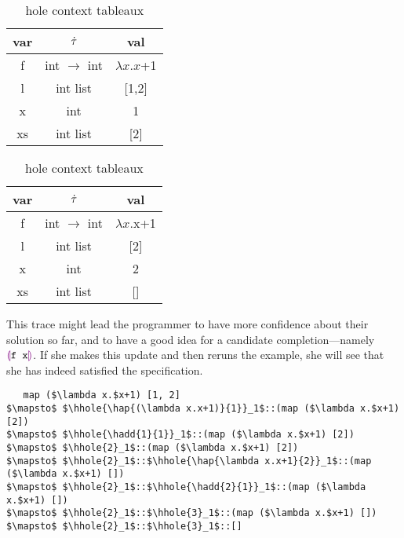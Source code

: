 \begin{table}
  \label{tabx}
  \caption{hole context tableaux}
  \begin{subtable}{.5\linewidth}
    \centering
        {
          \footnotesize
          \begin{tabular}{c|c|c}
            var & $\dot{\tau}$ & val\\
            \hline
            f & int $\to$ int & $\lambda x.x$+1\\
            l & int list & [1,2]\\
            x & int & 1\\
            xs & int list & [2]\\
          \end{tabular}
        }
  \end{subtable}%
  \begin{subtable}{.5\linewidth}
    \centering
        {
          \footnotesize
          \begin{tabular}{c|c|c}
            var & $\dot{\tau}$ & val\\
            \hline
            f & int $\to$ int & $\lambda x.$x+1\\
            l & int list & [2]\\
            x & int & 2\\
            xs & int list & []\\
          \end{tabular}
        }
  \end{subtable}
\end{table}

This trace might lead the programmer to have more confidence about their
solution so far, and to have a good idea for a candidate
completion---namely $\textcolor{violet}{\llparenthesis}\texttt{f x}\textcolor{violet}{\rrparenthesis}$. If she makes this update and
then reruns the example, she will see that she has indeed satisfied the
specification.
\begin{lstlisting}
   map ($\lambda x.$x+1) [1, 2]
$\mapsto$ $\hhole{\hap{(\lambda x.x+1)}{1}}_1$::(map ($\lambda x.$x+1) [2])
$\mapsto$ $\hhole{\hadd{1}{1}}_1$::(map ($\lambda x.$x+1) [2])
$\mapsto$ $\hhole{2}_1$::(map ($\lambda x.$x+1) [2])
$\mapsto$ $\hhole{2}_1$::$\hhole{\hap{\lambda x.x+1}{2}}_1$::(map ($\lambda x.$x+1) [])
$\mapsto$ $\hhole{2}_1$::$\hhole{\hadd{2}{1}}_1$::(map ($\lambda x.$x+1) [])
$\mapsto$ $\hhole{2}_1$::$\hhole{3}_1$::(map ($\lambda x.$x+1) [])
$\mapsto$ $\hhole{2}_1$::$\hhole{3}_1$::[]
\end{lstlisting}
